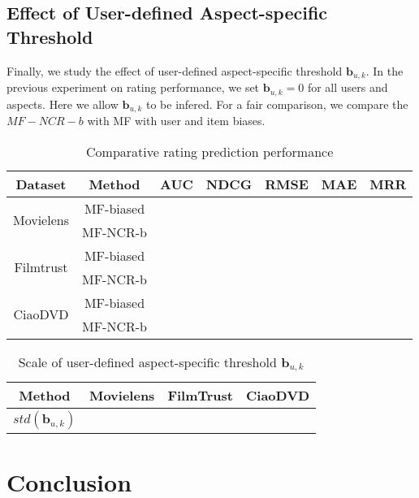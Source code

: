 \documentclass[letterpaper]{article} %
\begin{document}
\subsection{Effect of User-defined Aspect-specific Threshold}

Finally, we study the effect of user-defined aspect-specific threshold $\mathbf{b}_{u,k}$. In the previous experiment on rating performance, we set $\mathbf{b}_{u,k}=0$ for all users and aspects. Here we allow $\mathbf{b}_{u,k}$ to be infered. For a fair comparison, we compare the $MF-NCR-b$ with MF with user and item biases.  

\begin{table}[htp]
\tiny
\caption{Comparative rating prediction performance}
\begin{center}
\begin{tabular}{|c|c|c|c|c|c|c|}
\hline
Dataset & Method & AUC & NDCG & RMSE & MAE & MRR \\\hline
\multirow{2}{*}{Movielens} & MF-biased &  & 	 &	 &	 &	 
 \\\cline{2-7}
 & MF-NCR-b & & 	 &	 &	 &	 
 \\\hline
\multirow{2}{*}{Filmtrust} & MF-biased & &	 &	 	&  &	 
 \\\cline{2-7}
 & MF-NCR-b &  & 	 &	 & 	 & 	 
\\\hline
 \multirow{2}{*}{CiaoDVD} & MF-biased & & 	 &	 & 	 	 &  
\\\cline{2-7}
 & MF-NCR-b & & 	 &	 &	 	&  
 \\\hline
\end{tabular}
\end{center}
\label{tab:biasresult}
\end{table}%


\begin{table}[htp]
\caption{Scale of user-defined aspect-specific threshold $\mathbf{b}_{u,k}$}
\begin{center}
\begin{tabular}{|c|c|c|c|}
\hline
Method & Movielens & FilmTrust & CiaoDVD \\\hline
$std(\mathbf{b}_{u,k})$ & & & \\\hline
\end{tabular}
\end{center}
\label{tab:bias}
\end{table}%



\section{Conclusion}\label{sec:conclusion}




\end{document}
